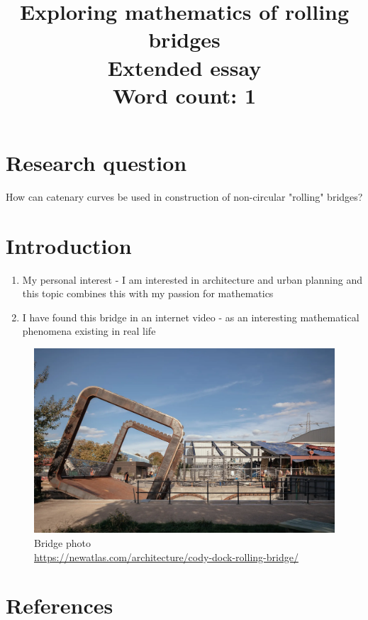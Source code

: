 \documentclass[12pt]{article}
\title{Exploring mathematics of rolling bridges \\
    \large Extended essay \\
    \vspace{12pt} Word count: 1}
\date{}
\author{}
\begin{document}
    \maketitle
    \newpage
    \tableofcontents
    \newpage
    
    \section{Research question}

    How can catenary curves be used in construction of non-circular "rolling" bridges?
    
    \section{Introduction}
    
        \begin{enumerate}
            \item My personal interest - I am interested in architecture and urban planning and this topic combines this with my passion for mathematics
            \item I have found this bridge in an internet video - as an interesting mathematical phenomena existing in real life
        \end{enumerate}

        \begin{figure}[H]
            \centering
            \includegraphics[width=0.75\linewidth]{images/bridge.png}
            \caption{Bridge photo \\\url{https://newatlas.com/architecture/cody-dock-rolling-bridge/}}
            \label{fig:bridge_photo}
        \end{figure}

    \section{References}
\end{document}
